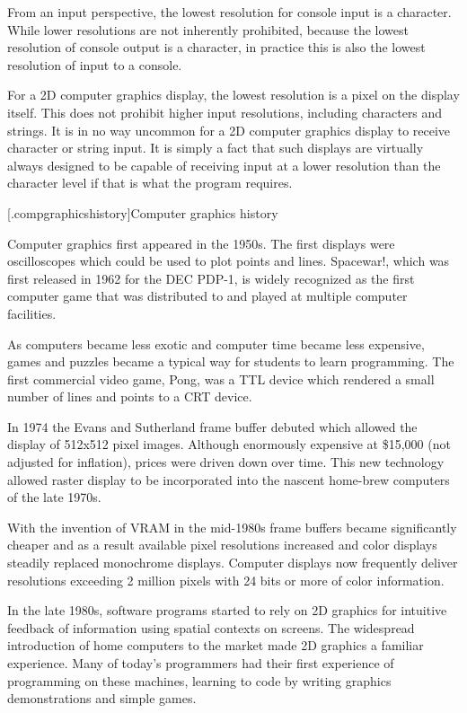 \pnum
From an input perspective, the lowest resolution for console input is a character. While lower resolutions are not inherently prohibited, because the lowest resolution of console output is a character, in practice this is also the lowest resolution of input to a console.

\pnum
For a 2D computer graphics display, the lowest resolution is a pixel on the display itself. This does not prohibit higher input resolutions, including characters and strings. It is in no way uncommon for a 2D computer graphics display to receive character or string input. It is simply a fact that such displays are virtually always designed to be capable of receiving input at a lower resolution than the character level if that is what the program requires.

[\iotwod.compgraphicshistory]{Computer graphics history}

\pnum
Computer graphics first appeared in the 1950s. The first displays were oscilloscopes which could be used to plot points and lines. Spacewar!, which was first released in 1962 for the DEC PDP-1, is widely recognized as the first computer game that was distributed to and played at multiple computer facilities.

\pnum
As computers became less exotic and computer time became less expensive, games and puzzles became a typical way for students to learn programming. The first commercial video game, Pong, was a TTL device which rendered a small number of lines and points to a CRT device.

\pnum
In 1974 the Evans and Sutherland frame buffer debuted which allowed the display of 512x512 pixel images. Although enormously expensive at \$15,000 (not adjusted for inflation), prices were driven down over time. This new technology allowed raster display to be incorporated into the nascent home-brew computers of the late 1970s.

\pnum
With the invention of VRAM in the mid-1980s frame buffers became significantly cheaper and as a result available pixel resolutions increased and color displays steadily replaced monochrome displays. Computer displays now frequently deliver resolutions exceeding 2 million pixels with 24 bits or more of color information.

\pnum
In the late 1980s, software programs started to rely on 2D graphics for intuitive feedback of information using spatial contexts on screens. The widespread introduction of home computers to the market made 2D graphics a familiar experience. Many of today’s programmers had their first experience of programming on these machines, learning to code by writing graphics demonstrations and simple games.

